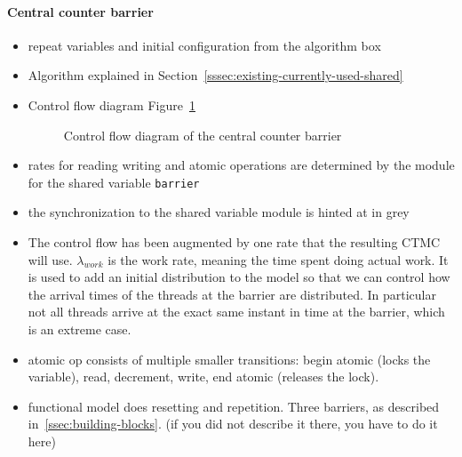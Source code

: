 \documentclass[a4paper, 10pt]{article}
\begin{document}
\paragraph{Central counter barrier}
\label{sssec:analysis-modelchecking-modelling-central-counter}
\begin{itemize}
	\item repeat variables and initial configuration from the algorithm box
	\item Algorithm explained in Section~\ref{sssec:existing-currently-used-shared}
	\item Control flow diagram Figure~\ref{fig:model-central-counter}
		\begin{figure}[htbp]
			\centering
			
			\caption{Control flow diagram of the central counter barrier}
			\label{fig:model-central-counter}
		\end{figure}
	\item rates for reading writing and atomic operations are determined by the module for the shared variable \texttt{barrier}
	\item the synchronization to the shared variable module is hinted at in grey
	\item The control flow has been augmented by one rate that the resulting CTMC will use. $\lambda_{work}$ is the work rate, meaning the time spent doing actual work. It is used to add an initial distribution to the model so that we can control how the arrival times of the threads at the barrier are distributed. In particular not all threads arrive at the exact same instant in time at the barrier, which is an extreme case.
	\item atomic op consists of multiple smaller transitions: begin atomic (locks the variable), read, decrement, write, end atomic (releases the lock).
	\item functional model does resetting and repetition. Three barriers, as described in~\ref{ssec:building-blocks}. (if you did not describe it there, you have to do it here)
\end{itemize}

\end{document}
